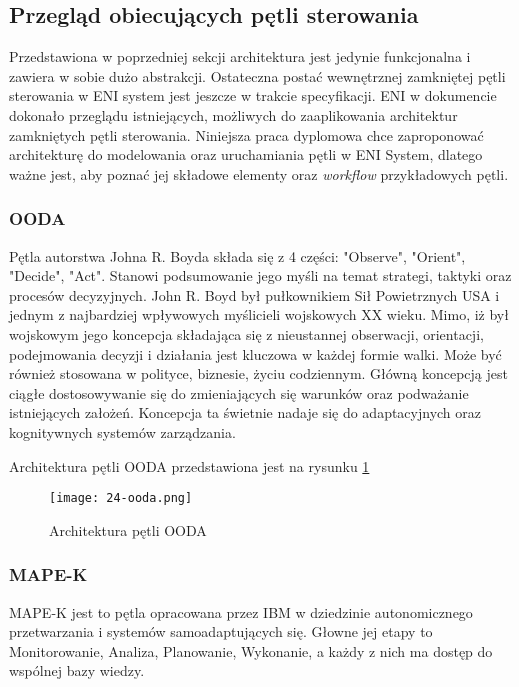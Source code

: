 \subsection{Przegląd obiecujących pętli sterowania}

Przedstawiona w poprzedniej sekcji architektura jest jedynie funkcjonalna i zawiera w sobie dużo abstrakcji. Ostateczna postać wewnętrznej zamkniętej pętli sterowania w ENI system jest jeszcze w trakcie specyfikacji. ENI w dokumencie \cite{enioverview} dokonało przeglądu istniejących, możliwych do zaaplikowania architektur zamkniętych pętli sterowania. Niniejsza praca dyplomowa chce zaproponować architekturę do modelowania oraz uruchamiania pętli w ENI System, dlatego ważne jest, aby poznać jej składowe elementy oraz \textit{workflow} przykładowych pętli.

\subsubsection{OODA}
Pętla autorstwa Johna R. Boyda składa się z 4 części: "Observe", "Orient", "Decide", "Act". Stanowi podsumowanie jego myśli na temat strategi, taktyki oraz procesów decyzyjnych. John R. Boyd był pułkownikiem Sił Powietrznych USA i jednym z najbardziej wpływowych myślicieli wojskowych XX wieku. Mimo, iż był wojskowym jego koncepcja składająca się z nieustannej obserwacji, orientacji, podejmowania decyzji i działania jest kluczowa w każdej formie walki. Może być również stosowana w polityce, biznesie, życiu codziennym. Główną koncepcją jest ciągłe dostosowywanie się do zmieniających się warunków oraz podważanie istniejących założeń. Koncepcja ta świetnie nadaje się do adaptacyjnych oraz kognitywnych systemów zarządzania.

Architektura pętli OODA przedstawiona jest na rysunku \ref{fig:24-ooda}

\begin{figure}[!h]
    \centering \texttt{[image: 24-ooda.png]}
    \caption{Architektura pętli OODA}\label{fig:24-ooda}
\end{figure}


\subsubsection{MAPE-K}
MAPE-K jest to pętla opracowana przez IBM w dziedzinie autonomicznego przetwarzania i systemów samoadaptujących się. Głowne jej etapy to Monitorowanie, Analiza, Planowanie, Wykonanie, a każdy z nich ma dostęp do wspólnej bazy wiedzy. 

